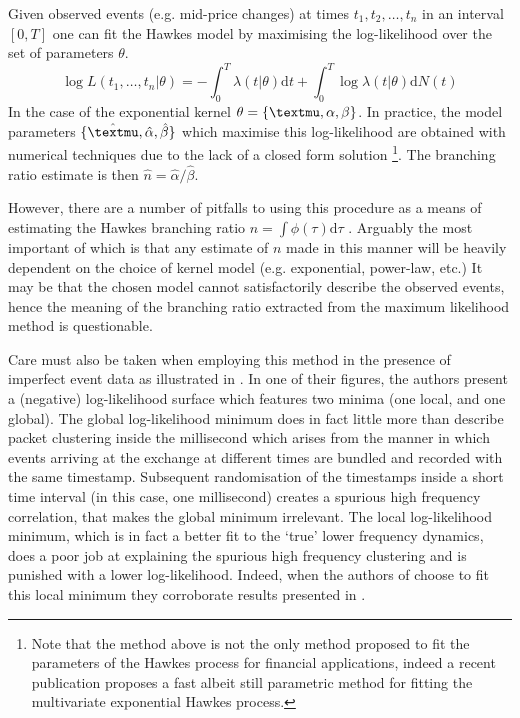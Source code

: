 \documentclass{article}
\begin{document}
Given observed events (e.g. mid-price changes) at times $t_1, t_2, \ldots,
t_n$ in an interval $[0, T]$ one can fit the Hawkes model by maximising the
log-likelihood {\cite{rubin,ozaki}} over the set of parameters $\theta$.
\begin{equation}
  \log L (t_1, \ldots, t_n | \theta) = - \int_0^T \lambda (t| \theta)
  \mathrm{d} t + \int_0^T \log \lambda (t| \theta) \mathrm{d} N (t)
  \label{eq:loglikelihood}
\end{equation}
In the case of the exponential kernel $\theta = \{{\textmu}, \alpha, \beta\}$.
In practice, the model parameters $\{ \hat{{\textmu}}, \hat{\alpha},
\hat{\beta} \}$ which maximise this log-likelihood are obtained with numerical
techniques due to the lack of a closed form solution \footnote{Note that the
method above is not the only method proposed to fit the parameters of the
Hawkes process for financial applications, indeed a recent publication
{\cite{dafonseca}} proposes a fast albeit still parametric method for fitting
the multivariate exponential Hawkes process.}. The branching ratio estimate is
then $\hat{n} = \hat{\alpha} / \hat{\beta}$.

However, there are a number of pitfalls to using this procedure as a means of
estimating the Hawkes branching ratio $n = \int \phi (\tau) \mathrm{d} \tau$
{\cite{apparentcriticality}}. Arguably the most important of which is that any
estimate of $n$ made in this manner will be heavily dependent on the choice of
kernel model (e.g. exponential, power-law, etc.) It may be that the chosen
model cannot satisfactorily describe the observed events, hence the meaning of
the branching ratio extracted from the maximum likelihood method is
questionable.

Care must also be taken when employing this method in the presence of
imperfect event data as illustrated in {\cite{apparentcriticality}}. In one of
their figures, the authors present a (negative) log-likelihood surface which
features two minima (one local, and one global). The global log-likelihood
minimum does in fact little more than describe packet clustering inside the
millisecond which arises from the manner in which events arriving at the
exchange at different times are bundled and recorded with the same timestamp.
Subsequent randomisation of the timestamps inside a short time interval (in
this case, one millisecond) creates a spurious high frequency correlation,
that makes the global minimum irrelevant. The local log-likelihood minimum,
which is in fact a better fit to the `true' lower frequency dynamics, does a
poor job at explaining the spurious high frequency clustering and is punished
with a lower log-likelihood. Indeed, when the authors of
{\cite{apparentcriticality}} choose to fit this local minimum they corroborate
results presented in {\cite{criticalreflexivity}}.
\end{document}
